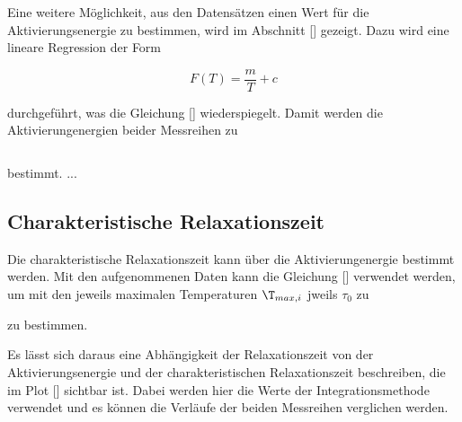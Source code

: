 Eine weitere Möglichkeit, aus den Datensätzen einen Wert für die Aktivierungsenergie zu bestimmen, wird im Abschnitt [] gezeigt. Dazu wird eine lineare Regression der Form 

\begin{equation}
    F(T) = \frac{m}{T} + c
\end{equation}

durchgeführt, was die Gleichung [] wiederspiegelt. Damit werden die Aktivierungenergien beider Messreihen zu 

\begin{equation}
    
\end{equation}

bestimmt. ...

\subsection{Charakteristische Relaxationszeit}

Die charakteristische Relaxationszeit kann über die Aktivierungenergie bestimmt werden. Mit den aufgenommenen Daten kann die Gleichung [] verwendet werden, um mit den jeweils 
maximalen Temperaturen $\T_{max,i}$ jweils $\tau_0$ zu 

\begin{equation}
    
\end{equation}
zu bestimmen. 

Es lässt sich daraus eine Abhängigkeit der Relaxationszeit von der Aktivierungsenergie und der charakteristischen Relaxationszeit beschreiben, die im Plot [] sichtbar ist. Dabei 
werden hier die Werte der Integrationsmethode verwendet und es können die Verläufe der beiden Messreihen verglichen werden. 


